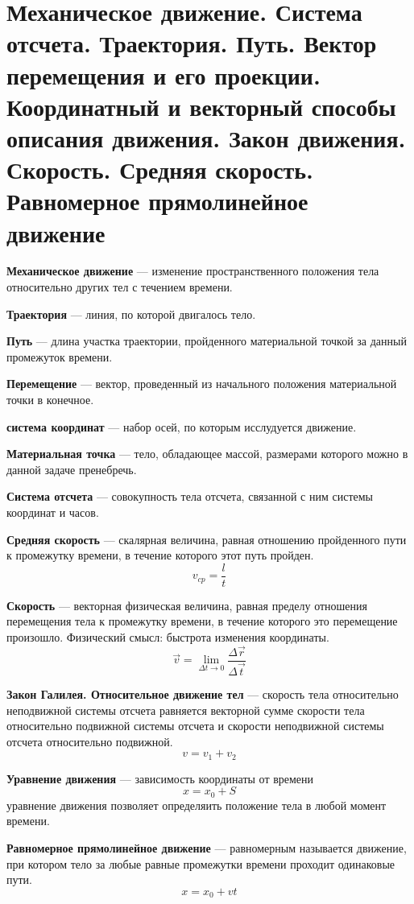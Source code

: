 \documentclass{report}
\begin{document}
\tableofcontents
\renewcommand{\partname}{Билет}
\part{Механическое движение. 
Система отсчета. 
Траектория. Путь. 
Вектор перемещения и его проекции. 
Координатный и векторный способы описания движения. 
Закон движения. 
Скорость. 
Средняя скорость. 
Равномерное прямолинейное движение}

{\bf Механическое движение} ---
изменение пространственного положения тела относительно других тел с течением времени. 

{\bf Траектория} ---
линия, по которой двигалось тело.

{\bf Путь} ---
длина участка траектории, пройденного материальной точкой за данный промежуток времени.

{\bf Перемещение} ---
вектор, проведенный из начального положения материальной точки в конечное. 

{\bf система координат} ---
набор осей, по которым исслудуется движение.

{\bf Материальная точка} ---
тело, обладающее массой, размерами которого можно в данной задаче пренебречь.

{\bf Система отсчета} ---
совокупность тела отсчета, связанной с ним системы координат и часов.

{\bf Средняя скорость} ---
скалярная величина, равная отношению пройденного пути к промежутку времени, 
в течение которого этот путь пройден. 
$$
v_{cp}=\frac{l}{t}
$$

{\bf Скорость} ---
векторная физическая величина, равная пределу отношения перемещения тела к промежутку 
времени, в течение которого это перемещение произошло.
Физический смысл: быстрота изменения координаты.
$$
\vec{v}=\lim_{\Delta t\rightarrow 0}\frac{\Delta \vec{r}}{\Delta \vec{t}}
$$

{\bf Закон Галилея. Относительное движение тел} ---
скорость тела относительно неподвижной системы отсчета равняется векторной сумме 
скорости тела относительно подвижной системы отсчета и скорости неподвижной 
системы отсчета относительно подвижной.
$$
v=v_1+v_2
$$

{\bf Уравнение движения} ---
зависимость координаты от времени
$$
x=x_0+S
$$
уравнение движения позволяет определяить положение тела в любой момент времени.

{\bf Равномерное прямолинейное движение} ---
равномерным называется движение, при котором тело за любые равные промежутки времени 
проходит одинаковые пути.
$$
x=x_0+vt
$$
\end{document}
